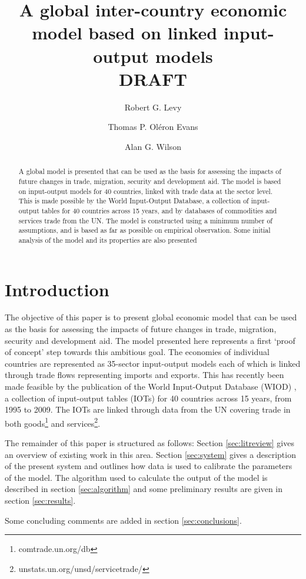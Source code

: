 \documentclass[a4paper]{article}
\title{A global inter-country economic model based on linked input-output models \\ DRAFT}
\author[*]{Robert G. Levy}
\author[**]{Thomas P. Ol\'{e}ron Evans}
\author[*]{Alan G. Wilson}
\affil[*]{Centre for Advanced Spatial Analysis, UCL Bartlett Faculty of the Built Environment,
90 Tottenham Court Road, London W1T 4TJ, UK}
\affil[**]{Department of Mathematics, University College London, Gower Street, London WC1E 6BT, UK}
\begin{document}
\maketitle

\begin{abstract}
A global model is presented that can be used as the basis for assessing the impacts of future changes in trade, migration, security and development aid.
The model is based on input-output models for 40 countries, linked with trade data at the sector level.
This is made possible by the World Input-Output Database, a collection of input-output tables for 40 countries across 15 years, and by databases of commodities and services trade from the UN.
The model is constructed using a minimum number of assumptions, and is based as far as possible on empirical observation.
Some initial analysis of the model and its properties are also presented
\end{abstract}

\section{Introduction}
The objective of this paper is to present global economic model that can be used as the basis for assessing the impacts of future changes in trade, migration, security and development aid.
The model presented here represents a first `proof of concept' step towards this ambitious goal.
The economies of individual countries are represented as 35-sector input-output models each of which is linked through trade flows representing imports and exports.
This has recently been made feasible by the publication of the World Input-Output Database (WIOD) \parencite{Timmer2012}, a collection of input-output tables (IOTs) for 40 countries across 15 years, from 1995 to 2009.
The IOTs are linked through data from the UN covering trade in both goods\footnote{comtrade.un.org/db} and services\footnote{unstats.un.org/unsd/servicetrade/}.

The remainder of this paper is structured as follows: 
Section \ref{sec:litreview} gives an overview of existing work in this area.
Section \ref{sec:system} gives a description of the present system and outlines how data is used to calibrate the parameters of the model.
The algorithm used to calculate the output of the model is described in section \ref{sec:algorithm} and some preliminary results are given in section \ref{sec:results}.

Some concluding comments are added in section \ref{sec:conclusions}.
\end{document}
